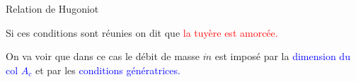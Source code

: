\begin{frame}{Relation de Hugoniot}
\begin{itemize}

\pause 
\medskip

	
\end{itemize}

Si ces conditions sont réunies on dit que \textcolor{red}{ la tuyère est amorcée.}

On va voir que dans ce cas le débit de masse $\dot m$ est  imposé par la 
\textcolor{blue}{dimension du col $A_c$} et  par les \textcolor{blue}{conditions génératrices.}






\vspace{0mm}

\end{frame}



%
%
%
%
%
%
%
%
%

